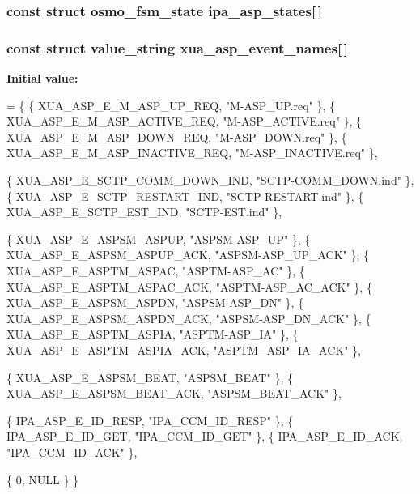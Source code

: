\subsubsection[{ipa\+\_\+asp\+\_\+states}]{\setlength{\rightskip}{0pt plus 5cm}const struct osmo\+\_\+fsm\+\_\+state ipa\+\_\+asp\+\_\+states[$\,$]\hspace{0.3cm}{\ttfamily [static]}}\label{xua__asp__fsm_8c_ab5bd360ec117ebf15b8e5514e268fcab}
\subsubsection[{xua\+\_\+asp\+\_\+event\+\_\+names}]{\setlength{\rightskip}{0pt plus 5cm}const struct value\+\_\+string xua\+\_\+asp\+\_\+event\+\_\+names[$\,$]\hspace{0.3cm}{\ttfamily [static]}}\label{xua__asp__fsm_8c_af176eecc69f63bb969d9dc136cd45559}
{\bfseries Initial value\+:}
\begin{DoxyCode}
= \{
        \{ XUA_ASP_E_M_ASP_UP_REQ,       \textcolor{stringliteral}{"M-ASP\_UP.req"} \},
        \{ XUA_ASP_E_M_ASP_ACTIVE_REQ,   \textcolor{stringliteral}{"M-ASP\_ACTIVE.req"} \},
        \{ XUA_ASP_E_M_ASP_DOWN_REQ,     \textcolor{stringliteral}{"M-ASP\_DOWN.req"} \},
        \{ XUA_ASP_E_M_ASP_INACTIVE_REQ, \textcolor{stringliteral}{"M-ASP\_INACTIVE.req"} \},

        \{ XUA_ASP_E_SCTP_COMM_DOWN_IND, \textcolor{stringliteral}{"SCTP-COMM\_DOWN.ind"} \},
        \{ XUA_ASP_E_SCTP_RESTART_IND,   \textcolor{stringliteral}{"SCTP-RESTART.ind"} \},
        \{ XUA_ASP_E_SCTP_EST_IND,       \textcolor{stringliteral}{"SCTP-EST.ind"} \},

        \{ XUA_ASP_E_ASPSM_ASPUP,        \textcolor{stringliteral}{"ASPSM-ASP\_UP"} \},
        \{ XUA_ASP_E_ASPSM_ASPUP_ACK,    \textcolor{stringliteral}{"ASPSM-ASP\_UP\_ACK"} \},
        \{ XUA_ASP_E_ASPTM_ASPAC,        \textcolor{stringliteral}{"ASPTM-ASP\_AC"} \},
        \{ XUA_ASP_E_ASPTM_ASPAC_ACK,    \textcolor{stringliteral}{"ASPTM-ASP\_AC\_ACK"} \},
        \{ XUA_ASP_E_ASPSM_ASPDN,        \textcolor{stringliteral}{"ASPSM-ASP\_DN"} \},
        \{ XUA_ASP_E_ASPSM_ASPDN_ACK,    \textcolor{stringliteral}{"ASPSM-ASP\_DN\_ACK"} \},
        \{ XUA_ASP_E_ASPTM_ASPIA,        \textcolor{stringliteral}{"ASPTM-ASP\_IA"} \},
        \{ XUA_ASP_E_ASPTM_ASPIA_ACK,    \textcolor{stringliteral}{"ASPTM\_ASP\_IA\_ACK"} \},

        \{ XUA_ASP_E_ASPSM_BEAT,         \textcolor{stringliteral}{"ASPSM\_BEAT"} \},
        \{ XUA_ASP_E_ASPSM_BEAT_ACK,     \textcolor{stringliteral}{"ASPSM\_BEAT\_ACK"} \},

        \{ IPA_ASP_E_ID_RESP,            \textcolor{stringliteral}{"IPA\_CCM\_ID\_RESP"} \},
        \{ IPA_ASP_E_ID_GET,             \textcolor{stringliteral}{"IPA\_CCM\_ID\_GET"} \},
        \{ IPA_ASP_E_ID_ACK,             \textcolor{stringliteral}{"IPA\_CCM\_ID\_ACK"} \},

        \{ 0, NULL \}
\}
\end{DoxyCode}
